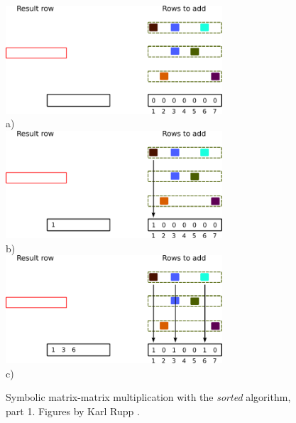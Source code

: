 \begin{figure}[H]
\centering
\includegraphics[width=0.72\textwidth]{sorted/spgemm-sorted-3}\\
a)\\
\vspace*{5mm}
\includegraphics[width=0.72\textwidth]{sorted/spgemm-sorted-4}\\
b)\\
\vspace*{5mm}
\includegraphics[width=0.72\textwidth]{sorted/spgemm-sorted-6}\\
c)\\
\vspace*{5mm}
\caption{Symbolic matrix-matrix multiplication with the \textit{sorted} algorithm, part 1. Figures by Karl Rupp \cite{karli_LANS_image}.}
\label{fig:spgemm-sorted_1}
\end{figure}

